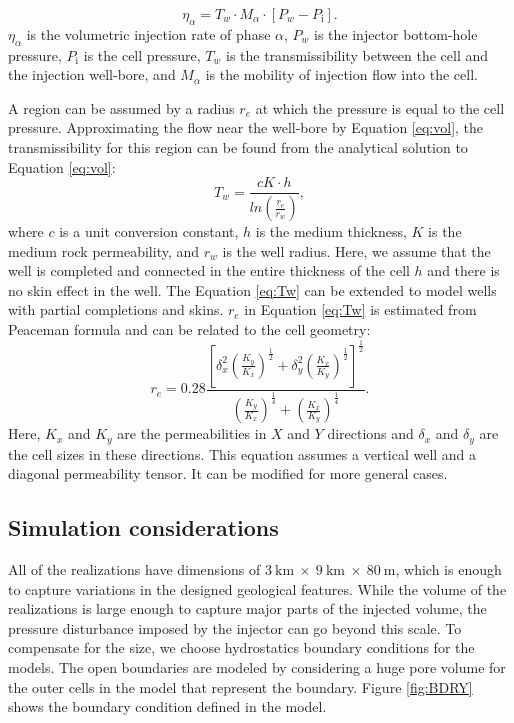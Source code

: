 \begin{equation}
 \eta_{\alpha}=T_w\cdot M_{\alpha}\cdot [P_w-P_{\mbox{i}}].
 \label{eq:WFLW}
\end{equation} $\eta_{\alpha}$ is the volumetric injection rate of phase
$\alpha$, $P_w$ is the injector bottom-hole pressure, $P_{\mbox{i}}$ is the
cell pressure, $T_{w}$ is the transmissibility between the cell and the
injection well-bore, and $M_\alpha$ is the mobility of injection flow into the
cell. 

A region can be assumed by a radius $r_e$ at which the
pressure is equal to the cell pressure. Approximating the flow near the
well-bore by Equation \ref{eq:vol}, the transmissibility for this region can be
found from the analytical solution to Equation \ref{eq:vol}:
\begin{equation}
 T_w=\frac{c K \cdot h}{ln(\frac{r_e}{r_w})},
 \label{eq:Tw}
\end{equation} where $c$ is a unit conversion constant, $h$ is the medium
thickness, $K$ is the medium rock permeability, and $r_{w}$ is the well radius.
Here, we assume that the well is completed and connected in the entire thickness
of the cell $h$ and there is no skin effect in the well. The Equation
\ref{eq:Tw} can be extended to model wells with partial completions and skins.
$r_{e}$ in Equation \ref{eq:Tw} is estimated from Peaceman formula and can be
related to the cell geometry:
\begin{equation}
r_e =  0.28\frac{\left[
\delta_x^2(\frac{K_y}{K_x})^{\frac{1}{2}}+\delta_y^2(\frac{K_x}{K_y})^{\frac{1}{
2}}\right]^{\frac{1}{2}}}{(\frac{K_y}{K_x})^{\frac{1}{4}}+(\frac{K_x}{K_y})^{
\frac{1}{4}}}.
\label{eq:rinf} 
\end{equation} Here, $K_x$ and $K_y$ are the permeabilities in $X$ and $Y$
directions and $\delta_x$ and $\delta_y$ are the cell sizes in these directions.
This equation assumes a vertical well and a diagonal permeability tensor. It can
be modified for more general cases.

\subsection{Simulation considerations}

All of the realizations have dimensions of
$3~\mbox{km}~\times~9~\mbox{km}~\times~80~\mbox{m}$, which is enough to capture
variations in the designed geological features. While the volume of the
realizations is large enough to capture major parts of the injected volume, the
pressure disturbance imposed by the injector can go beyond this
scale. To compensate for the size, we choose hydrostatics boundary conditions
for the models. The open boundaries are modeled by considering a huge pore
volume for the outer cells in the model that represent the boundary. Figure
\ref{fig:BDRY} shows the boundary condition defined in the model.

